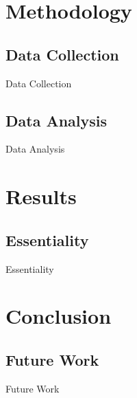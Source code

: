 \documentclass{slides}
\begin{document}
\section{Methodology}
\subsection{Data Collection}
\begin{Slide}{Data Collection}
\end{Slide}

\subsection{Data Analysis}
\begin{Slide}{Data Analysis}
\end{Slide}

\section{Results}
\subsection{Essentiality}
\begin{Slide}{Essentiality}
\end{Slide}

\section{Conclusion}
\subsection{Future Work}
\begin{Slide}{Future Work}
\end{Slide}
\end{document}
